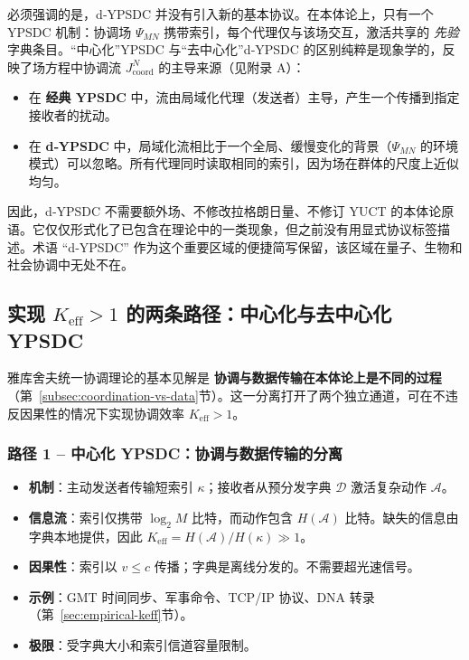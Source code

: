 \documentclass[11pt,a4paper]{article}
\begin{document}
	必须强调的是，d‑YPSDC 并没有引入新的基本协议。在本体论上，只有一个 YPSDC 机制：协调场 \(\Psi_{MN}\) 携带索引，每个代理仅与该场交互，激活共享的 \emph{先验} 字典条目。“中心化”YPSDC 与“去中心化”d‑YPSDC 的区别纯粹是现象学的，反映了场方程中协调流 \(J^{N}_{\mathrm{coord}}\) 的主导来源（见附录 A）：
	\begin{itemize}[leftmargin=*]
		\item 在 \textbf{经典 YPSDC} 中，流由局域化代理（发送者）主导，产生一个传播到指定接收者的扰动。
		\item 在 \textbf{d‑YPSDC} 中，局域化流相比于一个全局、缓慢变化的背景（\(\Psi_{MN}\) 的环境模式）可以忽略。所有代理同时读取相同的索引，因为场在群体的尺度上近似均匀。
	\end{itemize}
	因此，d‑YPSDC 不需要额外场、不修改拉格朗日量、不修订 YUCT 的本体论原语。它仅仅形式化了已包含在理论中的一类现象，但之前没有用显式协议标签描述。术语 “d‑YPSDC” 作为这个重要区域的便捷简写保留，该区域在量子、生物和社会协调中无处不在。
	
	\subsection{实现 \(K_{\mathrm{eff}} > 1\) 的两条路径：中心化与去中心化 YPSDC}
	\label{subsec:two-paths}
	
	雅库舍夫统一协调理论的基本见解是 \textbf{协调与数据传输在本体论上是不同的过程}
	（第~\ref{subsec:coordination-vs-data}节）。这一分离打开了两个独立通道，可在不违反因果性的情况下实现协调效率
	\(K_{\mathrm{eff}} > 1\)。
	
	\subsubsection*{路径 1 – 中心化 YPSDC：协调与数据传输的分离}
	\begin{itemize}[leftmargin=*]
		\item \textbf{机制}：主动发送者传输短索引 \(\kappa\)；接收者从预分发字典 \(\mathcal{D}\) 激活复杂动作 \(\mathcal{A}\)。
		\item \textbf{信息流}：索引仅携带 \(\log_2 M\) 比特，而动作包含 \(H(\mathcal{A})\) 比特。缺失的信息由字典本地提供，因此 \(K_{\mathrm{eff}} = H(\mathcal{A}) / H(\kappa) \gg 1\)。
		\item \textbf{因果性}：索引以 \(v \le c\) 传播；字典是离线分发的。不需要超光速信号。
		\item \textbf{示例}：GMT 时间同步、军事命令、TCP/IP 协议、DNA 转录（第~\ref{sec:empirical-keff}节）。
		\item \textbf{极限}：受字典大小和索引信道容量限制。
	\end{itemize}
	
\end{document}
